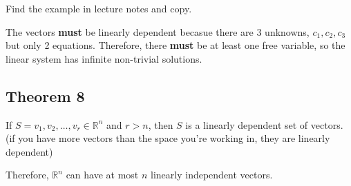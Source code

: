 \documentclass[12pt]{article}
\begin{document}
Find the example in lecture notes and copy.

The vectors \textbf{must} be linearly dependent becasue there are 3 unknowns,
$c_1, c_2, c_3$ but only 2 equations. Therefore, there \textbf{must} be at least one
free variable, so the linear system has infinite non-trivial solutions.

\subsection{Theorem 8}

If $S={v_1, v_2, \dots, v_r} \in \mathbb{R}^{n}$ and $r > n$, then $S$ is
a linearly dependent set of vectors. (if you have more vectors than the space
you're working in, they are linearly dependent)

Therefore, $\mathbb{R}^n$ can have at most $n$ linearly independent vectors.
\end{document}
